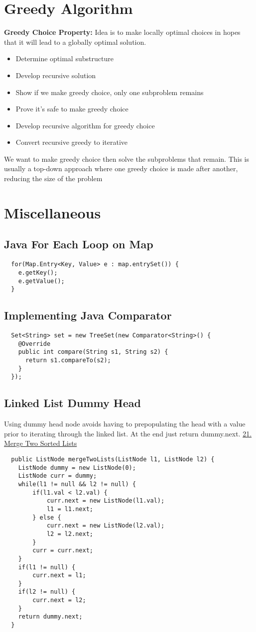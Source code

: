 \documentclass{article}
\begin{document}
  \section{Greedy Algorithm}
  \textbf{Greedy Choice Property: }Idea is to make locally optimal choices in hopes that it will lead to a globally optimal solution.
  \begin{itemize}[noitemsep]
    \item Determine optimal substructure
    \item Develop recursive solution 
    \item Show if we make greedy choice, only one subproblem remains
    \item Prove it's safe to make greedy choice
    \item Develop recursive algorithm for greedy choice
    \item Convert recursive greedy to iterative
  \end{itemize}
  We want to make greedy choice then solve the subproblems that remain. This is usually a top-down approach where one greedy choice is made after another, reducing the size of the problem
  \section{Miscellaneous}
  \subsection{Java For Each Loop on Map}
  \begin{lstlisting}
  for(Map.Entry<Key, Value> e : map.entrySet()) {
    e.getKey();
    e.getValue();
  }
  \end{lstlisting}
  \subsection{Implementing Java Comparator}
  \begin{lstlisting}
  Set<String> set = new TreeSet(new Comparator<String>() {
    @Override
    public int compare(String s1, String s2) {
      return s1.compareTo(s2);
    }
  });
  \end{lstlisting}
  \subsection{Linked List Dummy Head}
  Using dummy head node avoids having to prepopulating the head with a value prior to iterating through the linked list. At the end just return dummy.next. \href{https://leetcode.com/problems/merge-two-sorted-lists/}{21. Merge Two Sorted Lists
}
  \begin{lstlisting}
  public ListNode mergeTwoLists(ListNode l1, ListNode l2) {
    ListNode dummy = new ListNode(0);
    ListNode curr = dummy;
    while(l1 != null && l2 != null) {
        if(l1.val < l2.val) {
            curr.next = new ListNode(l1.val);
            l1 = l1.next;
        } else {
            curr.next = new ListNode(l2.val);
            l2 = l2.next;
        }
        curr = curr.next;
    }
    if(l1 != null) {
        curr.next = l1;
    }
    if(l2 != null) {
        curr.next = l2;
    }
    return dummy.next;
  }
  \end{lstlisting}
\end{document}
